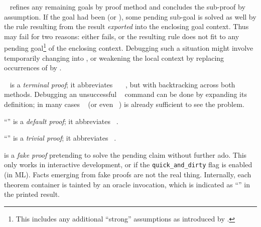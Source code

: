 \begin{isabellebody}
\begin{isamarkuptext}
\begin{descr}
  \item [\mbox{\isa{\isacommand{qed}}}~\isa{m\isactrlsub {\isadigit{2}}}] refines any remaining
  goals by proof method  and concludes the
  sub-proof by assumption.  If the goal had been  (or
  ), some pending sub-goal is solved as well by the rule
  resulting from the result \emph{exported} into the enclosing goal
  context.  Thus  may fail for two reasons: either  fails, or the resulting rule does not fit to any
  pending goal\footnote{This includes any additional ``strong''
  assumptions as introduced by \mbox{}.} of the enclosing
  context.  Debugging such a situation might involve temporarily
  changing \mbox{} into \mbox{}, or weakening the
  local context by replacing occurrences of \mbox{} by
  \mbox{}.
  
  \item [\mbox{\isa{\isacommand{by}}}~\isa{m\isactrlsub {\isadigit{1}}\ m\isactrlsub {\isadigit{2}}}] is a
  \emph{terminal proof}; it abbreviates
  \mbox{}~~~, but with backtracking across both methods.  Debugging
  an unsuccessful \mbox{}~
  command can be done by expanding its definition; in many cases
  \mbox{}~ (or even ~) is already sufficient to see the
  problem.

  \item [``\mbox{\isa{\isacommand{{\isachardot}{\isachardot}}}}''] is a \emph{default
  proof}; it abbreviates \mbox{}~.

  \item [``\mbox{\isa{\isacommand{{\isachardot}}}}''] is a \emph{trivial
  proof}; it abbreviates \mbox{}~.
  
  \item [\mbox{\isa{\isacommand{sorry}}}] is a \emph{fake proof}
  pretending to solve the pending claim without further ado.  This
  only works in interactive development, or if the \verb|quick_and_dirty| flag is enabled (in ML).  Facts emerging from fake
  proofs are not the real thing.  Internally, each theorem container
  is tainted by an oracle invocation, which is indicated as ``\isa{{\isacharbrackleft}{\isacharbang}{\isacharbrackright}}'' in the printed result.
  

\end{descr}
\end{isamarkuptext}
\end{isabellebody}
